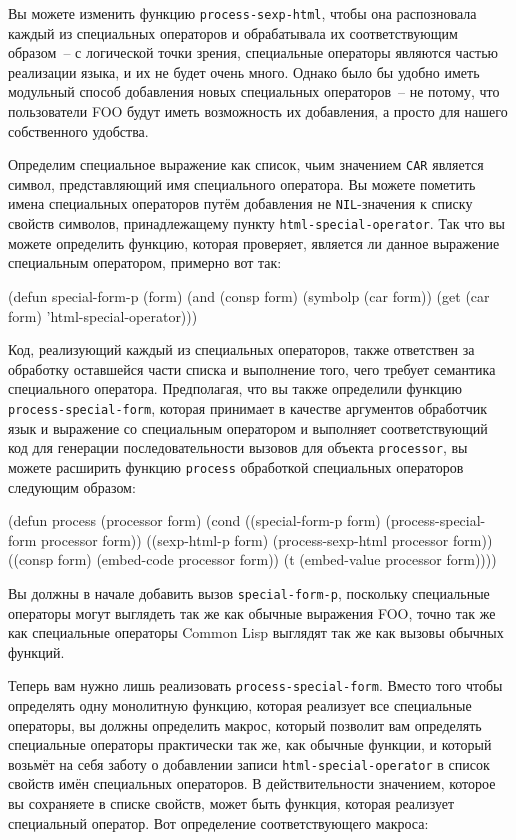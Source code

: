 Вы можете изменить функцию \lstinline{process-sexp-html}, чтобы она распозновала каждый из
специальных операторов и обрабатывала их соответствующим образом~-- с логической точки
зрения, специальные операторы являются частью реализации языка, и их не будет очень
много. Однако было бы удобно иметь модульный способ добавления новых специальных
операторов~-- не потому, что пользователи FOO будут иметь возможность их добавления, а
просто для нашего собственного удобства.

Определим специальное выражение как список, чьим значением \lstinline{CAR} является
символ, представляющий имя специального оператора.  Вы можете пометить имена спе\-циаль\-ных
операторов путём добавления не \lstinline{NIL}-значения к списку свойств символов,
принадлежащему пункту \lstinline{html-special-operator}.  Так что вы можете определить
функцию, которая проверяет, является ли данное выражение специальным оператором, примерно
вот так:

\begin{myverb}
(defun special-form-p (form)
  (and (consp form) (symbolp (car form)) (get (car form) 'html-special-operator)))
\end{myverb}

Код, реализующий каждый из специальных операторов, также ответствен за обработку
оставшейся части списка и выполнение того, чего требует семантика специального оператора.
Предполагая, что вы также определили функцию \lstinline{process-special-form}, которая
принимает в качестве аргументов обработчик язык и выражение со специальным оператором и
выполняет соответствующий код для генерации последовательности вызовов для объекта
\lstinline{processor}, вы можете расширить функцию \lstinline{process} обработкой
специальных операторов следующим образом:

\begin{myverb}
(defun process (processor form)
  (cond
    ((special-form-p form) (process-special-form processor form))
    ((sexp-html-p form)    (process-sexp-html processor form))
    ((consp form)          (embed-code processor form))
    (t                     (embed-value processor form))))
\end{myverb}

Вы должны в начале добавить вызов \lstinline{special-form-p}, поскольку спе\-циаль\-ные операторы
могут выглядеть так же как обычные выражения FOO, точно так же как специальные операторы
Common Lisp выглядят так же как вызовы обычных функций.

Теперь вам нужно лишь реализовать \lstinline{process-special-form}.  Вместо того чтобы
определять одну монолитную функцию, которая реализует все специальные операторы, вы должны
определить макрос, который позволит вам определять специальные операторы практически
так же, как обычные функции, и который возьмёт на себя заботу о добавлении записи
\lstinline{html-special-operator} в список свойств имён специальных операторов.  В
действительности значением, которое вы сохраняете в списке свойств, может быть функция,
которая реализует специальный оператор.  Вот определение соответствующего макроса:

